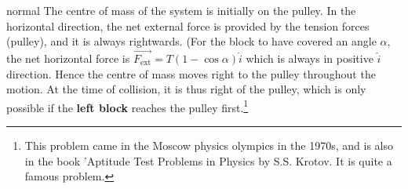 \begin{solution}{normal}
The centre of mass of the system is initially on the pulley. In the horizontal direction, the net external force is provided by the tension forces (pulley), and it is always rightwards. (For the block to have covered an angle $\alpha$, the net horizontal force is $\vec{F_{\text{ext}}} = T(1- \cos{\alpha}) \hat{i}$ which is always in positive $\hat{i}$ direction. Hence the centre of mass moves right to the pulley throughout the motion. At the time of collision, it is thus right of the pulley, which is only possible if the \textbf{left block} reaches the pulley first.\footnote{This problem came in the Moscow physics olympics in the 1970s, and is also in the book 'Aptitude Test Problems in Physics by S.S. Krotov. It is quite a famous problem.}
\end{solution}
